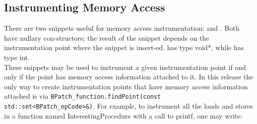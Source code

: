 \subsection{Instrumenting Memory Access}


There are two snippets useful for memory access instrumentation: \BPatcheffectiveAddressExpr and \BPatchbytesAccessedExpr.  Both have nullary con-structors; the result of the snippet depends on the instrumentation point where the snippet is insert-ed.  \BPatcheffectiveAddressExpr has type void*, while \BPatchbytesAccessedExpr has type int.\\

These snippets may be used to instrument a given instrumentation point if and only if the point has memory access information attached to it.  In this release the only way to create instrumentation points that have memory access information attached is via \texttt{BPatch\_function.findPoint(const std::set<BPatch\_opCode>\&)}.  For example, to instrument all the loads and stores in a function named InterestingProcedure with a call to printf, one may write:\\\\
